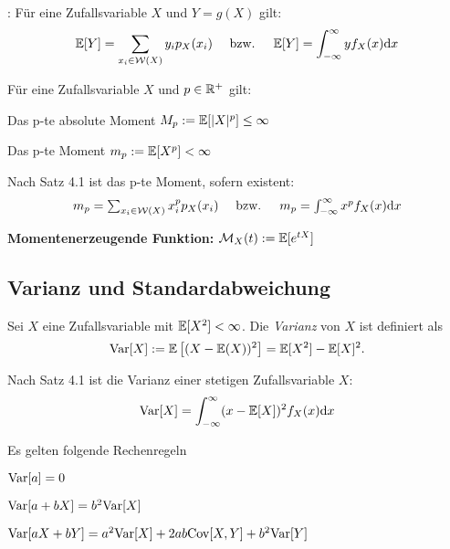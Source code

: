 \begin{theorem}[4.1]:
	Für eine Zufallsvariable \(X\) und \(Y=g(X)\) gilt:
	\[
		\mathbb{E}[Y] = \sum_{x_i \in \mathcal{W}(X)} y_i p_{X}(x_i)
		\quad \text{ bzw. } \quad
		\mathbb{E}[Y] = \int_{-\infty}^\infty y f_X(x) \mathrm{d} x
	\]
\end{theorem}

\begin{definition}
	Für eine Zufallsvariable \(X\) und \(p \in \mathbb{R}^+\) gilt:
	\begin{compactitem}
		\item Das p-te absolute Moment \(M_p := \mathbb{E}[\lvert X \rvert ^p] \leq \infty\)
		\item Das p-te  Moment \(m_p := \mathbb{E}[X  ^p] < \infty\)
	\end{compactitem}

	Nach Satz 4.1 ist das p-te Moment, sofern existent:
	\[ \textstyle
		m_p = \sum_{x_i \in \mathcal{W}(X)} x_i^p p_{X}(x_i)
		\quad	\text{ bzw. }	\quad
		m_p = \int_{-\infty}^\infty x^p f_X(x) \mathrm{d} x
	\]

	\textbf{Momentenerzeugende Funktion:} \(\mathcal{M}_X(t) := \mathbb{E}[e^{tX}] \)
\end{definition}



\subsection{Varianz und Standardabweichung}

\begin{definition}[Varianz]
	Sei \(X\) eine Zufallsvariable mit \(\mathbb{E}[X^2] < \infty\). Die \emph{Varianz} von \(X\) ist definiert als
	\[
		\mathrm{Var}[X] := \mathbb{E}\left[(X-\mathbb{E}(X))^2\right] = \mathbb{E}[X^2]-\mathbb{E}[X]^2.
	\]

	Nach Satz 4.1 ist die Varianz einer stetigen Zufallsvariable \(X\):
	\[
		\mathrm{Var}[X] = \int_{-\infty}^\infty (x-\mathbb{E}[X])^2 f_X(x) \mathrm{d} x
	\]

\end{definition}


\begin{note}
	Es gelten folgende Rechenregeln
	\begin{compactenum}[i:]
		\item \(\mathrm{Var}[a] = 0\)
		\item \(\mathrm{Var}[a + bX] = b^2 \mathrm{Var}[X]\)
		\item \(\mathrm{Var}[aX + bY] = a^2 \mathrm{Var}[X] + 2ab\mathrm{Cov}[X,Y] + b^2 \mathrm{Var}[Y]\)
	\end{compactenum}
\end{note}

